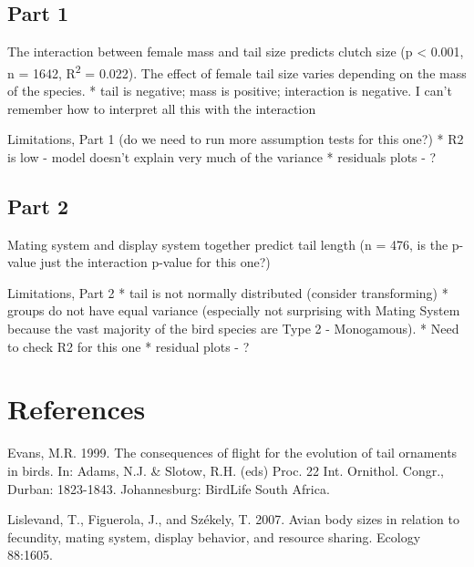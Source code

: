 \documentclass[
  12pt,
]{article}
\begin{document}
\hypertarget{part-1}{%
\subsection{Part 1}\label{part-1}}

The interaction between female mass and tail size predicts clutch size
(p \textless{} 0.001, n = 1642, R\textsuperscript{2} = 0.022). The
effect of female tail size varies depending on the mass of the species.
* tail is negative; mass is positive; interaction is negative. I can't
remember how to interpret all this with the interaction

Limitations, Part 1 (do we need to run more assumption tests for this
one?) * R2 is low - model doesn't explain very much of the variance *
residuals plots - ?

\hypertarget{part-2}{%
\subsection{Part 2}\label{part-2}}

Mating system and display system together predict tail length (n = 476,
is the p-value just the interaction p-value for this one?)

Limitations, Part 2 * tail is not normally distributed (consider
transforming) * groups do not have equal variance (especially not
surprising with Mating System because the vast majority of the bird
species are Type 2 - Monogamous). * Need to check R2 for this one *
residual plots - ?

\newpage

\hypertarget{references}{%
\section{References}\label{references}}

Evans, M.R. 1999. The consequences of flight for the evolution of tail
ornaments in birds. In: Adams, N.J. \& Slotow, R.H. (eds) Proc. 22 Int.
Ornithol. Congr., Durban: 1823-1843. Johannesburg: BirdLife South
Africa.

Lislevand, T., Figuerola, J., and Székely, T. 2007. Avian body sizes in
relation to fecundity, mating system, display behavior, and resource
sharing. Ecology 88:1605.
\end{document}
